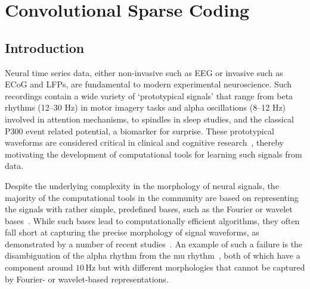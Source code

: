 \chapter{Convolutional Sparse Coding}
\label{chapter:alphacsc}


\noindent{}%

\section{Introduction}
\label{sec:alphacsc_intro}
Neural time series data, either non-invasive such as \ac{EEG} 
or invasive such as \ac{ECoG} and \acp{LFP}, are fundamental to modern experimental neuroscience. Such recordings contain a wide variety of `prototypical signals' that range from beta rhythms (12--30 Hz) in motor imagery tasks and alpha oscillations (8--12 Hz) involved in attention mechanisms, to spindles in sleep studies, 
and the classical P300 event related potential, a biomarker for surprise. 
%
These prototypical waveforms are considered critical in clinical and cognitive research~\cite{cole2017brain}, thereby motivating the development of computational tools for learning such signals from data.


Despite the underlying complexity in the morphology of neural signals, the majority of the computational tools in the community are based on representing the signals with rather simple, predefined bases, such as the Fourier or wavelet bases~\cite{cohen2014analyzing}.
While such bases lead to computationally efficient algorithms, they often fall short at capturing the precise morphology of signal waveforms, as demonstrated by a number of recent studies~\cite{jones2016brain,mazaheri2008asymmetric}. An example of such a failure is the disambiguation of the alpha rhythm from the mu rhythm~\cite{hari2017meg}, both of which have a component around $10$\,Hz but with different morphologies that cannot be captured by Fourier- or wavelet-based representations.

